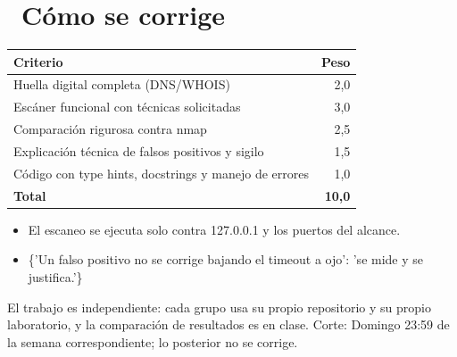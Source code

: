 \documentclass[11pt,a4paper]{article}
\newcommand{\iconotexto}[2]{\textcolor{cyanNeon}{\faIcon{#1}}~#2}
\begin{document}
\section{\iconotexto{ruler-combined}{Cómo se corrige}}

\begin{tabularx}{\linewidth}{@{}X r@{}}
\toprule
Criterio & Peso\\
\midrule
Huella digital completa (DNS/WHOIS) & 2,0 \\
Escáner funcional con técnicas solicitadas & 3,0 \\
Comparación rigurosa contra nmap & 2,5 \\
Explicación técnica de falsos positivos y sigilo & 1,5 \\
Código con type hints, docstrings y manejo de errores & 1,0 \\
\midrule
\textbf{Total} & \textbf{10,0}\\
\bottomrule
\end{tabularx}

\begin{itemize}[leftmargin=1.4em,itemsep=2pt,topsep=3pt]
  \item El escaneo se ejecuta solo contra 127.0.0.1 y los puertos del alcance.
  \item \{'Un falso positivo no se corrige bajando el timeout a ojo': 'se mide y se justifica.'\}
\end{itemize}

\begin{cajaRecuerda}El trabajo es independiente: cada grupo usa su propio repositorio y su propio laboratorio, y la comparación de resultados es en clase. Corte: Domingo 23:59 de la semana correspondiente; lo posterior no se corrige.
\end{cajaRecuerda}
\end{document}
